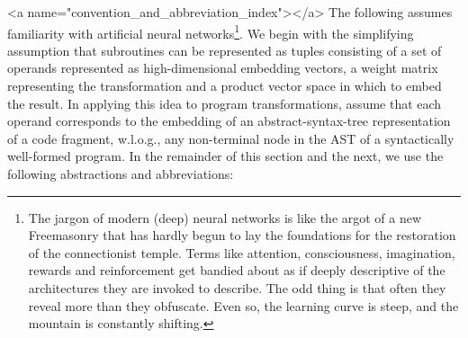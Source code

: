 \rawhtml
<a name="convention_and_abbreviation_index"></a>
\endrawhtml
The following assumes familiarity with artificial neural networks\footnote{%
%
  The jargon of modern (deep) neural networks is like the argot of a new Freemasonry that has hardly begun to lay the foundations for the restoration of the connectionist temple. Terms like attention, consciousness, imagination, rewards and reinforcement get bandied about as if deeply descriptive of the architectures they are invoked to describe. The odd thing is that often they reveal more than they obfuscate. Even so, the learning curve is steep, and the mountain is constantly shifting.}. 
%
We begin with the simplifying assumption that subroutines can be represented as tuples consisting of a set of operands represented as high-dimensional embedding vectors, a weight matrix representing the transformation and a product vector space in which to embed the result. In applying this idea to program transformations, assume that each operand corresponds to the embedding of an abstract-syntax-tree representation of a code fragment, w.l.o.g., any non-terminal node in the AST of a syntactically well-formed program. In the remainder of this section and the next, we use the following abstractions and abbreviations:
%
